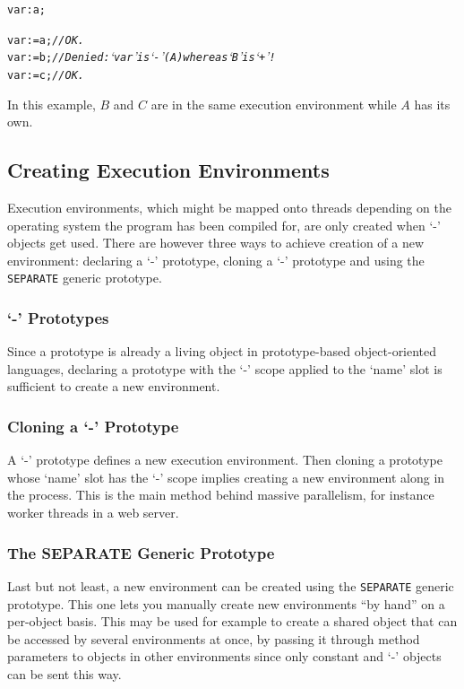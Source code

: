 \documentclass[11pt]{mybook}
\begin{document}
\begin{alltt}
var:{\sc{}a};

var := {\sc{}a}; {\it{}// OK.}
var := {\sc{}b}; {\it{}// Denied: `var' is `-' (A) whereas `B' is `+'!}
var := {\sc{}c}; {\it{}// OK.}
\end{alltt}

In this example, $B$ and $C$ are in the same execution environment
while $A$ has its own. 

\subsection{Creating Execution Environments}

Execution environments, which might be mapped onto threads depending
on the operating system the program has been compiled for, are only
created when `-' objects get used.  There are however three ways to
achieve creation of a new environment: declaring a `-' prototype,
cloning a `-' prototype and using the \verb!SEPARATE! generic
prototype. 

\subsubsection{`-' Prototypes}

Since a prototype is already a living object in prototype-based
object-oriented languages, declaring a prototype with the `-' scope
applied to the `name' slot is sufficient to create a new environment. 

\subsubsection{Cloning a `-' Prototype}

A `-' prototype defines a new execution environment.  Then cloning a
prototype whose `name' slot has the `-' scope implies creating a new
environment along in the process.  This is the main method behind
massive parallelism, for instance worker threads in a web server. 

\subsubsection{The SEPARATE Generic Prototype}

Last but not least, a new environment can be created using the
\verb!SEPARATE! generic prototype.  This one lets you manually create
new environments ``by hand'' on a per-object basis.  This may be used
for example to create a shared object that can be accessed by several
environments at once, by passing it through method parameters to
objects in other environments since only constant and `-' objects can
be sent this way. 
\end{document}
